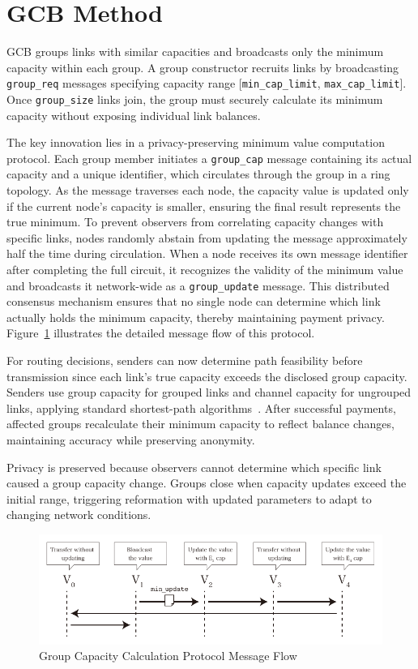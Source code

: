 \documentclass[conference]{IEEEtran}
\newcommand{\groupcap}{\texttt{group\_cap}}
\newcommand{\groupupdate}{\texttt{group\_update}}
\newcommand{\groupreq}{\texttt{group\_req}}
\newcommand{\groupsize}{\texttt{group\_size}}
\newcommand{\mincaplimit}{\texttt{min\_cap\_limit}}
\newcommand{\maxcaplimit}{\texttt{max\_cap\_limit}}
\begin{document}
\section{GCB Method}

GCB groups links with similar capacities and broadcasts only the minimum capacity within each group. A group constructor recruits links by broadcasting \groupreq{} messages specifying capacity range [\mincaplimit{}, \maxcaplimit{}]. Once \groupsize{} links join, the group must securely calculate its minimum capacity without exposing individual link balances.

The key innovation lies in a privacy-preserving minimum value computation protocol. Each group member initiates a \groupcap{} message containing its actual capacity and a unique identifier, which circulates through the group in a ring topology. As the message traverses each node, the capacity value is updated only if the current node's capacity is smaller, ensuring the final result represents the true minimum. To prevent observers from correlating capacity changes with specific links, nodes randomly abstain from updating the message approximately half the time during circulation. When a node receives its own message identifier after completing the full circuit, it recognizes the validity of the minimum value and broadcasts it network-wide as a \groupupdate{} message. This distributed consensus mechanism ensures that no single node can determine which link actually holds the minimum capacity, thereby maintaining payment privacy. Figure~\ref{fig:group_cap_handover} illustrates the detailed message flow of this protocol.

For routing decisions, senders can now determine path feasibility before transmission since each link's true capacity exceeds the disclosed group capacity. Senders use group capacity for grouped links and channel capacity for ungrouped links, applying standard shortest-path algorithms~\cite{lnd,eclair,clightning}. After successful payments, affected groups recalculate their minimum capacity to reflect balance changes, maintaining accuracy while preserving anonymity.

Privacy is preserved because observers cannot determine which specific link caused a group capacity change. Groups close when capacity updates exceed the initial range, triggering reformation with updated parameters to adapt to changing network conditions.

\begin{figure}[htbp]
	\centerline{\includegraphics[width=\linewidth]{fig/group_cap_handover}}
	\caption{Group Capacity Calculation Protocol Message Flow}
	\label{fig:group_cap_handover}
\end{figure}
\end{document}
